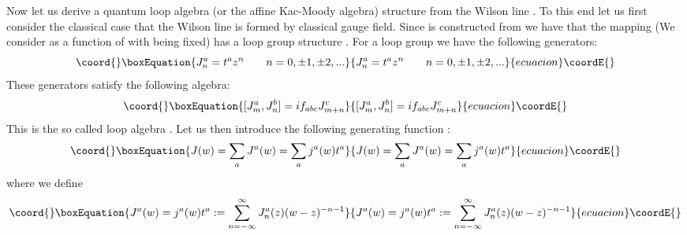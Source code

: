 \documentclass[a4paper,a4paper]{article}
\begin{document}
Now let us derive a quantum loop
algebra (or the affine Kac-Moody algebra)
structure from the Wilson line \coordHE{}. To this end
let us first consider the classical case that the Wilson line \coordHE{} is formed by classical gauge field. 
Since \coordHE{} is constructed from \coordHE{} we have that the mapping \coordHE{} (We consider \coordHE{} as a function of \coordHE{} with \coordHE{} being fixed) has a loop group structure \cite{Lus}\cite{Seg}.
For a loop group we have the following generators:
\begin{equation}\coord{}\boxEquation{
J_n^a = t^a z^n \qquad n=0, \pm 1, \pm 2, ...
\label{km1}
}{
J_n^a = t^a z^n \qquad n=0, \pm 1, \pm 2, ...
}{ecuacion}\coordE{}\end{equation}
These generators satisfy the following algebra:
\begin{equation}\coord{}\boxEquation{
[J_m^a, J_n^b] =
if_{abc}J_{m+n}^c 
\label{km2}
}{
[J_m^a, J_n^b] =
if_{abc}J_{m+n}^c 
}{ecuacion}\coordE{}\end{equation}
This is  the so called loop algebra \cite{Lus}\cite{Seg}. 
Let us then introduce the following generating
function \coordHE{}:
\begin{equation}\coord{}\boxEquation{
J(w) = \sum_a J^a(w)=\sum_a j^a(w) t^a
\label{km3}
}{
J(w) = \sum_a J^a(w)=\sum_a j^a(w) t^a
}{ecuacion}\coordE{}\end{equation}
where we define
\begin{equation}\coord{}\boxEquation{
J^a(w)= j^a(w) t^a :=
\sum_{n=-\infty}^{\infty}J_n^a(z) (w-z)^{-n-1}  
\label{km3a}
}{
J^a(w)= j^a(w) t^a :=
\sum_{n=-\infty}^{\infty}J_n^a(z) (w-z)^{-n-1}  
}{ecuacion}\coordE{}\end{equation}
\end{document}

